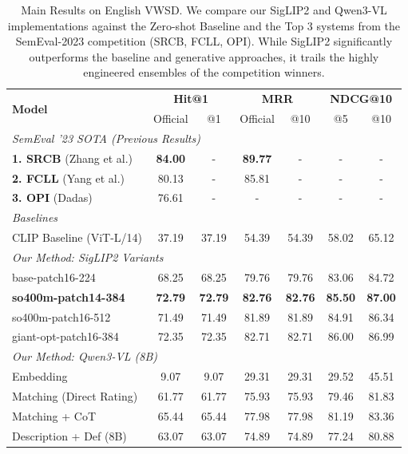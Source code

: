 \documentclass[11pt]{article}
\begin{document}
\begin{table}[t]
\centering
\small
\begin{tabular}{l|cc|cc|cc}
\toprule
\multirow{2}{*}{\textbf{Model}} & \multicolumn{2}{c|}{\textbf{Hit@1}} & \multicolumn{2}{c|}{\textbf{MRR}} & \multicolumn{2}{c}{\textbf{NDCG@10}} \\
& Official & @1 & Official & @10 & @5 & @10 \\
\midrule
\multicolumn{7}{l}{\textit{SemEval '23 SOTA (Previous Results)}} \\
\midrule
\textbf{1. SRCB} (Zhang et al.) & \textbf{84.00} & - & \textbf{89.77} & - & - & - \\
\textbf{2. FCLL} (Yang et al.) & 80.13 & - & 85.81 & - & - & - \\
\textbf{3. OPI} (Dadas) & 76.61 & - & - & - & - & - \\
\midrule
\multicolumn{7}{l}{\textit{Baselines}} \\
\midrule
CLIP Baseline (ViT-L/14) & 37.19 & 37.19 & 54.39 & 54.39 & 58.02 & 65.12 \\
\midrule
\multicolumn{7}{l}{\textit{Our Method: SigLIP2 Variants}} \\
\midrule
base-patch16-224 & 68.25 & 68.25 & 79.76 & 79.76 & 83.06 & 84.72 \\
\textbf{so400m-patch14-384} & \textbf{72.79} & \textbf{72.79} & \textbf{82.76} & \textbf{82.76} & \textbf{85.50} & \textbf{87.00} \\
so400m-patch16-512 & 71.49 & 71.49 & 81.89 & 81.89 & 84.91 & 86.34 \\
giant-opt-patch16-384 & 72.35 & 72.35 & 82.71 & 82.71 & 86.00 & 86.99 \\
\midrule
\multicolumn{7}{l}{\textit{Our Method: Qwen3-VL (8B)}} \\
\midrule
Embedding  & 9.07 & 9.07 & 29.31 & 29.31 & 29.52 & 45.51 \\
Matching (Direct Rating) & 61.77 & 61.77 & 75.93 & 75.93 & 79.46 & 81.83 \\
Matching + CoT & 65.44 & 65.44 & 77.98 & 77.98 & 81.19 & 83.36 \\
Description + Def (8B) & 63.07 & 63.07 & 74.89 & 74.89 & 77.24 & 80.88 \\
\bottomrule
\end{tabular}
\caption{Main Results on English VWSD. We compare our SigLIP2 and Qwen3-VL implementations against the Zero-shot Baseline and the Top 3 systems from the SemEval-2023 competition (SRCB, FCLL, OPI). While SigLIP2 significantly outperforms the baseline and generative approaches, it trails the highly engineered ensembles of the competition winners.}
\label{tab:results}
\end{table}
\end{document}
